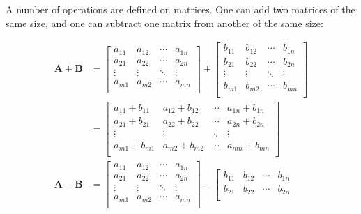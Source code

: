 A number of operations are defined on matrices. One can add two matrices of the same size, and one can subtract one matrix from another of the same size:

\begin{align*}
  \mathbf{A}+\mathbf{B} &=
  \left[
    \begin{matrix}
      a_{11} & a_{12} & \cdots & a_{1n} \\
      a_{21} & a_{22} & \cdots & a_{2n} \\
      \vdots & \vdots & \ddots & \vdots \\
      a_{m1} & a_{m2} & \cdots & a_{mn} \\
    \end{matrix}
  \right]
  +
  \left[
    \begin{matrix}
      b_{11} & b_{12} & \cdots & b_{1n} \\
      b_{21} & b_{22} & \cdots & b_{2n} \\
      \vdots & \vdots & \ddots & \vdots \\
      b_{m1} & b_{m2} & \cdots & b_{mn} \\
    \end{matrix}
  \right]
  \\
  &=
  \left[
    \begin{matrix}
      a_{11}+b_{11} & a_{12}+b_{12} & \cdots & a_{1n}+b_{1n} \\
      a_{21}+b_{21} & a_{22}+b_{22} & \cdots & a_{2n}+b_{2n} \\
      \vdots & \vdots & \ddots & \vdots \\
      a_{m1}+b_{m1} & a_{m2}+b_{m2} & \cdots & a_{mn}+b_{mn} \\
    \end{matrix}
  \right]
  \\
  \mathbf{A}-\mathbf{B} &=
  \left[
    \begin{matrix}
      a_{11} & a_{12} & \cdots & a_{1n} \\
      a_{21} & a_{22} & \cdots & a_{2n} \\
      \vdots & \vdots & \ddots & \vdots \\
      a_{m1} & a_{m2} & \cdots & a_{mn} \\
    \end{matrix}
  \right]
  -
  \left[
    \begin{matrix}
      b_{11} & b_{12} & \cdots & b_{1n} \\
      b_{21} & b_{22} & \cdots & b_{2n} \\

\end{matrix}
\end{align*}

